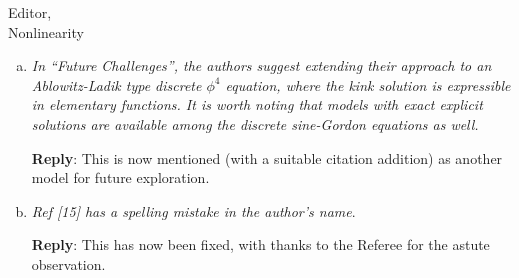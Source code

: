 \documentclass[11pt]{letter}
\begin{document}
\begin{letter}{Editor, \\
Nonlinearity}
\begin{enumerate}[(a)]
\item \emph{In ``Future Challenges'', the authors suggest extending their approach to an Ablowitz-Ladik type discrete $\phi^4$ equation, where the kink solution is expressible in elementary functions. It is worth noting that models with exact explicit solutions are available among the discrete sine-Gordon equations as well.} 

{\bf Reply}: This is now mentioned (with a suitable citation 
addition) as another model for future exploration.

\item \emph{Ref [15] has a spelling mistake in the author’s name}. 

{\bf Reply}: This has now been fixed, with thanks to the Referee
for the astute observation. 

\end{enumerate}


\end{letter}
\end{document}
